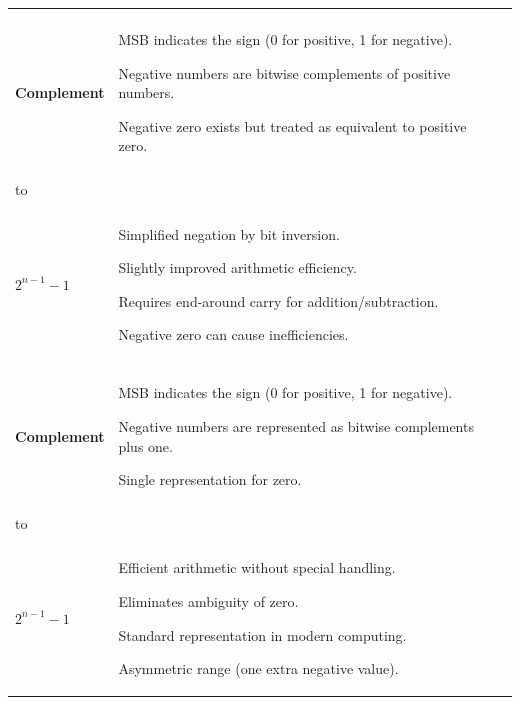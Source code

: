 \begin{longtable}{|m{2.8cm}|m{4.2cm}|m{1.9cm}|m{4.8cm}|}
\makecell{\textbf{One's} \\ \textbf{Complement}} &
MSB indicates the sign (0 for positive, 1 for negative). 
\vspace{\baselineskip}\par
Negative numbers are bitwise complements of positive numbers. 
\vspace{\baselineskip}\par
Negative zero exists but treated as equivalent to positive zero. &
\makecell{$-2^{n-1} + 1$ \\ \\ to \\ \\ $2^{n-1} - 1$} &
Simplified negation by bit inversion.
\vspace{\baselineskip}\par
Slightly improved arithmetic efficiency.
\vspace{\baselineskip}\par
Requires end-around carry for addition/subtraction.
\vspace{\baselineskip}\par
Negative zero can cause inefficiencies.
 \\ \hline

\makecell{\textbf{Two's} \\ \textbf{Complement}} &
MSB indicates the sign (0 for positive, 1 for negative). 
\vspace{\baselineskip}\par
Negative numbers are represented as bitwise complements plus one. 
\vspace{\baselineskip}\par
Single representation for zero. &
\makecell{$-2^{n-1}$ \\ \\ to \\ \\ $2^{n-1} - 1$} &
Efficient arithmetic without special handling.
\vspace{\baselineskip}\par
Eliminates ambiguity of zero.
\vspace{\baselineskip}\par
Standard representation in modern computing.
\vspace{\baselineskip}\par
Asymmetric range (one extra negative value).
 \\ \hline


\end{longtable}
